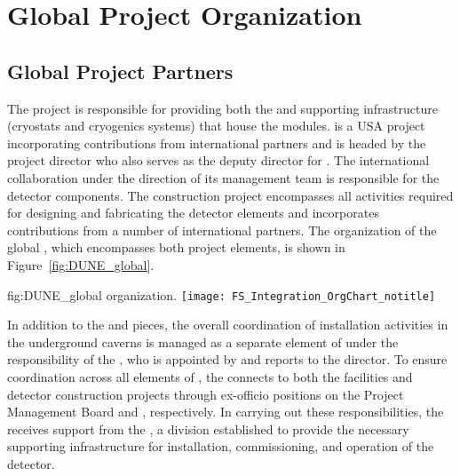 \chapter{Global Project Organization}
\label{vl:tc-global}

\section{Global Project Partners}
\label{sec:partners}

The  project is responsible for providing both the
 and supporting infrastructure (cryostats and
cryogenics systems) that house the  
modules.  is a USA  project incorporating
contributions from international partners and is headed by the
 project director who also serves as the 
deputy director for .  
The international 
collaboration under the direction of its management team is
responsible for the detector components.  The  
construction project encompasses all activities required for designing
and fabricating the detector elements and incorporates contributions
from a number of international partners.  The organization of the
global , which encompasses both project elements, is
shown in Figure~\ref{fig:DUNE_global}.
\begin{dunefigure}{fig:DUNE_global}
  { organization.}
  \texttt{[image: FS\_Integration\_OrgChart\_notitle]}
\end{dunefigure}

In addition to the  and  pieces, the overall
coordination of installation activities in the underground caverns 
is managed as a separate element of  under the
responsibility of the , who is appointed by and reports
to the  director.  To ensure coordination across
all elements of , the  connects to both
the facilities and detector construction projects through ex-officio
positions on the  Project Management Board and
 , respectively.  In carrying out these
responsibilities, the  receives support from the ,
a  division established to 
provide the necessary supporting infrastructure for installation, commissioning, and operation 
of the  detector.

